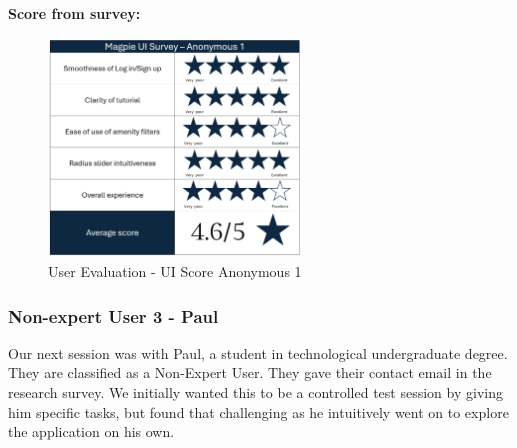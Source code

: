 \noindent\textbf{Score from survey: }
\begin{figure}[h!]
    \centering
    \includegraphics[width=0.6\textwidth]{images/survey-maira.png}
    \caption{User Evaluation - UI Score Anonymous 1}
\end{figure}

\newpage{}

\subsubsection{Non-expert User 3 - Paul}
Our next session was with Paul, a student in technological undergraduate degree.
They are classified as a Non-Expert User. They gave their contact email in the
research survey. We initially wanted this to be a controlled test session by
giving him specific tasks, but found that challenging as he intuitively went on
to explore the application on his own.

